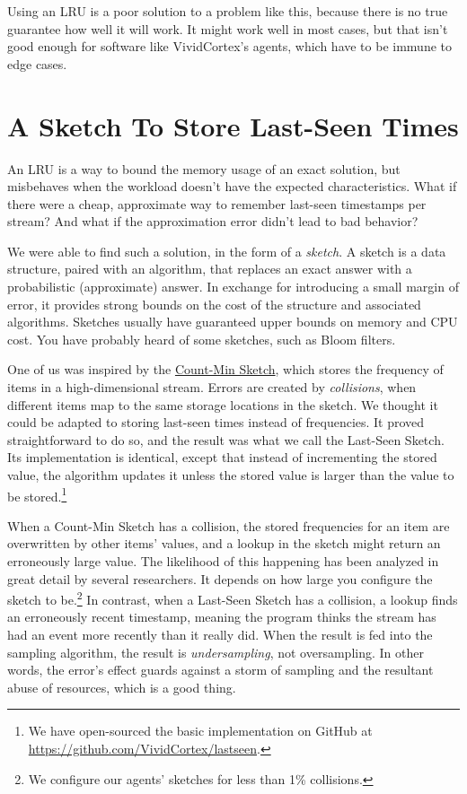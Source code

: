 \documentclass{vivid_layout}
\begin{document}
Using an LRU is a poor solution to a problem like this, because there is no true
guarantee how well it will work. It might work well in most cases, but that
isn't good enough for software like VividCortex's agents, which have to be
immune to edge cases.

\section{A Sketch To Store Last-Seen Times}

An LRU is a way to bound the memory usage of an exact solution, but misbehaves
when the workload doesn't have the expected characteristics. What if there were
a cheap, approximate way to remember last-seen timestamps per stream? And what if the
approximation error didn't lead to bad behavior?

We were able to find such a solution, in the form of a \emph{sketch}. A sketch
is a data structure, paired with an algorithm, that replaces an exact answer
with a probabilistic (approximate) answer. In exchange for introducing a small
margin of error, it provides strong bounds on the cost of the structure and
associated algorithms. Sketches usually have guaranteed upper bounds on memory
and CPU cost. You have probably heard of some sketches, such as Bloom filters.

One of us was inspired by the
\href{https://en.wikipedia.org/wiki/Count\%E2\%80\%93min\_sketch}{Count-Min
Sketch}, which stores the frequency of items in a high-dimensional stream.
Errors are created by \emph{collisions}, when different items map to the same
storage locations in the sketch. We thought it could be adapted to storing
last-seen times instead of frequencies. It proved straightforward to do so, and
the result was what we call the Last-Seen Sketch. Its implementation is
identical, except that instead of incrementing the stored value, the algorithm
updates it unless the stored value is larger than the value to be
stored.\footnote{We have open-sourced the basic implementation on GitHub at
\href{https://github.com/VividCortex/lastseen}{https://github.com/VividCortex/lastseen}.}

When a Count-Min Sketch has a collision, the stored frequencies for an item are
overwritten by other items' values, and a lookup in the sketch might return an
erroneously large value. The likelihood of this happening has been analyzed in
great detail by several researchers. It depends on how large you configure the
sketch to be.\footnote{We configure our agents' sketches for less than 1\%
collisions.} In contrast, when a Last-Seen Sketch has a collision, a lookup
finds an erroneously recent timestamp, meaning the program thinks the stream has
had an event more recently than it really did. When the result is fed into the
sampling algorithm, the result is \emph{undersampling}, not oversampling. In
other words, the error's effect guards against a storm of sampling and the
resultant abuse of resources, which is a good thing.
\end{document}
